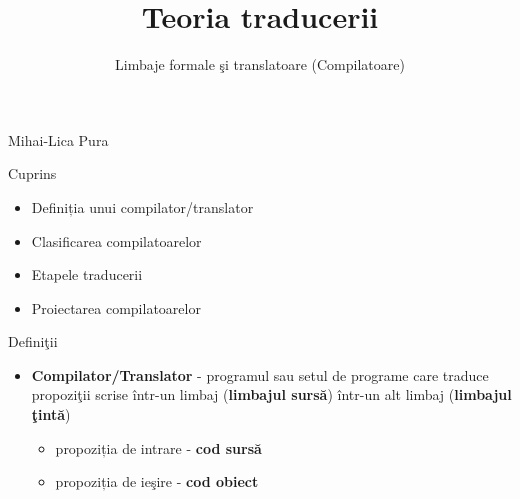\documentclass[pdf]{beamer}
\title{Teoria traducerii}
\subtitle{Limbaje formale şi translatoare (Compilatoare)}
\begin{document}
\begin{frame}
	\titlepage
	
\begin{flushright}
Mihai-Lica Pura\\
\end{flushright}

\end{frame}



\begin{frame}{Cuprins}
\begin{itemize}
\item
Definiția unui compilator/translator
\item
Clasificarea compilatoarelor
\item
Etapele traducerii
\item
Proiectarea compilatoarelor

\end{itemize}
\end{frame}



\begin{frame}{Definiţii}
\begin{itemize}
\item
\textbf{Compilator/Translator} - programul sau setul de programe care traduce propoziţii scrise într-un limbaj (\textbf{limbajul sursă}) într-un alt limbaj (\textbf{limbajul ţintă})

\begin{figure}
\centering
{}
\end{figure}

\begin{itemize}
\item
propoziția de intrare - \textbf{cod sursă}
\item
propoziția de ieşire - \textbf{cod obiect}
\end{itemize}
\end{itemize}
\end{frame}
\end{document}
